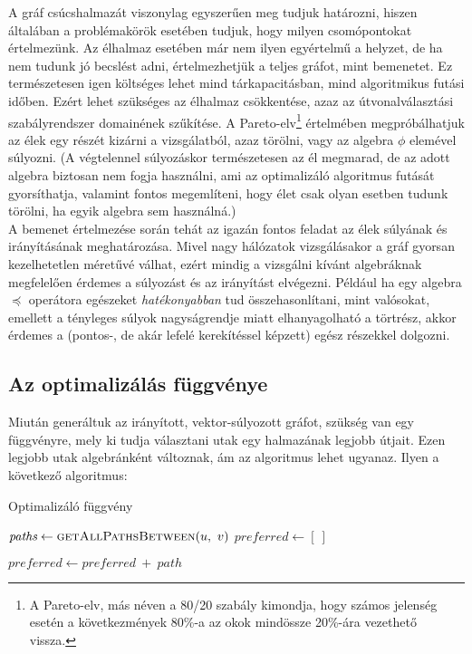       A gráf csúcshalmazát viszonylag egyszerűen meg tudjuk határozni, hiszen általában a problémakörök esetében tudjuk, hogy milyen csomópontokat értelmezünk. Az élhalmaz esetében már nem ilyen egyértelmű a helyzet, de ha nem tudunk jó becslést adni, értelmezhetjük a teljes gráfot, mint bemenetet. Ez természetesen igen költséges lehet mind tárkapacitásban, mind algoritmikus futási időben. Ezért lehet szükséges az élhalmaz csökkentése, azaz az útvonalválasztási szabályrendszer domainének szűkítése. A Pareto-elv\footnote{A Pareto-elv, más néven a 80/20 szabály kimondja, hogy számos jelenség esetén a következmények 80\%-a az okok mindössze 20\%-ára vezethető vissza.} értelmében megpróbálhatjuk az élek egy részét kizárni a vizsgálatból, azaz törölni, vagy az algebra $\phi$ elemével súlyozni. (A végtelennel súlyozáskor természetesen az él megmarad, de az adott algebra biztosan nem fogja használni, ami az optimalizáló algoritmus futását gyorsíthatja, valamint fontos megemlíteni, hogy élet csak olyan esetben tudunk törölni, ha egyik algebra sem használná.)\\

      A bemenet értelmezése során tehát az igazán fontos feladat az élek súlyának és irányításának meghatározása. Mivel nagy hálózatok vizsgálásakor a gráf gyorsan kezelhetetlen méretűvé válhat, ezért mindig a vizsgálni kívánt algebráknak megfelelően érdemes a súlyozást és az irányítást elvégezni. Például ha egy algebra $\preceq$ operátora egészeket \textit{hatékonyabban} tud összehasonlítani, mint valósokat, emellett a tényleges súlyok nagyságrendje miatt elhanyagolható a törtrész, akkor érdemes a (pontos-, de akár lefelé kerekítéssel képzett) egész részekkel dolgozni.

      \subsection{Az optimalizálás függvénye}
      Miután generáltuk az irányított, vektor-súlyozott gráfot, szükség van egy függvényre, mely ki tudja választani utak egy halmazának legjobb útjait. Ezen legjobb utak algebránként változnak, ám az algoritmus lehet ugyanaz. Ilyen a következő algoritmus:

      \begin{algorithm}
        \caption{Optimalizáló függvény}\label{algo_optimalizalo}
        \begin{algorithmic}[1]
            \State $\textit{paths} \gets \Call{getAllPathsBetween}{u,~v}$
            \State $\textit{preferred} \gets [~]$

                \State $\textit{preferred} \gets \textit{preferred}~+~path$
              \EndIf
            \EndFor
          \EndProcedure
        \end{algorithmic}
      \end{algorithm}

